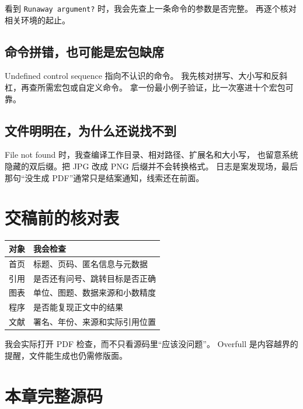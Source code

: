 看到 \verb|Runaway argument?| 时，我会先查上一条命令的参数是否完整。
再逐个核对相关环境的起止。

\subsection{命令拼错，也可能是宏包缺席}
Undefined control sequence 指向不认识的命令。
我先核对拼写、大小写和反斜杠，再查所需宏包或自定义命令。
拿一份最小例子验证，比一次塞进十个宏包可靠。

\subsection{文件明明在，为什么还说找不到}
File not found 时，我查编译工作目录、相对路径、扩展名和大小写，
也留意系统隐藏的双后缀。把 JPG 改成 PNG 后缀并不会转换格式。
日志是案发现场，最后那句“没生成 PDF”通常只是结案通知，线索还在前面。



\section{交稿前的核对表}
\begin{center}
\begin{tabular}{ll}
\toprule
对象 & 我会检查 \\
\midrule
首页 & 标题、页码、匿名信息与元数据 \\
引用 & 是否还有问号、跳转目标是否正确 \\
图表 & 单位、图题、数据来源和小数精度 \\
程序 & 是否能复现正文中的结果 \\
文献 & 署名、年份、来源和实际引用位置 \\
\bottomrule
\end{tabular}
\end{center}
我会实际打开 PDF 检查，而不只看源码里“应该没问题”。
Overfull 是内容越界的提醒，文件能生成也仍需修版面。

\section*{本章完整源码}


